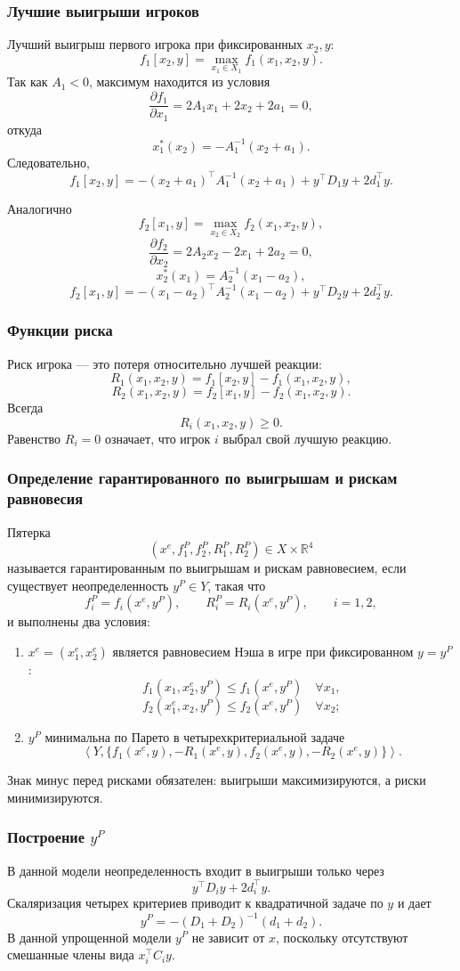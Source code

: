 \documentclass[12pt,a4paper]{article}
\newcommand{\R}{\mathbb{R}}
\begin{document}
\subsubsection{Лучшие выигрыши игроков}
Лучший выигрыш первого игрока при фиксированных $x_2,y$:
\[
f_1[x_2,y]=\max_{x_1\in X_1}f_1(x_1,x_2,y).
\]
Так как $A_1<0$, максимум находится из условия
\[
\frac{\partial f_1}{\partial x_1}=2A_1x_1+2x_2+2a_1=0,
\]
откуда
\[
x_1^*(x_2)=-A_1^{-1}(x_2+a_1).
\]
Следовательно,
\[
f_1[x_2,y]=-(x_2+a_1)^\top A_1^{-1}(x_2+a_1)+y^\top D_1y+2d_1^\top y.
\]

Аналогично
\[
f_2[x_1,y]=\max_{x_2\in X_2}f_2(x_1,x_2,y),
\]
\[
\frac{\partial f_2}{\partial x_2}=2A_2x_2-2x_1+2a_2=0,
\]
\[
x_2^*(x_1)=A_2^{-1}(x_1-a_2),
\]
\[
f_2[x_1,y]=-(x_1-a_2)^\top A_2^{-1}(x_1-a_2)+y^\top D_2y+2d_2^\top y.
\]

\subsubsection{Функции риска}
Риск игрока --- это потеря относительно лучшей реакции:
\[
R_1(x_1,x_2,y)=f_1[x_2,y]-f_1(x_1,x_2,y),
\]
\[
R_2(x_1,x_2,y)=f_2[x_1,y]-f_2(x_1,x_2,y).
\]
Всегда
\[
R_i(x_1,x_2,y)\ge 0.
\]
Равенство $R_i=0$ означает, что игрок $i$ выбрал свой лучшую реакцию.

\subsubsection{Определение гарантированного по выигрышам и рискам равновесия}
Пятерка
\[
(x^e,f_1^P,f_2^P,R_1^P,R_2^P)\in X\times\R^4
\]
называется гарантированным по выигрышам и рискам равновесием, если существует неопределенность $y^P\in Y$, такая что
\[
f_i^P=f_i(x^e,y^P),
\qquad R_i^P=R_i(x^e,y^P),
\qquad i=1,2,
\]
и выполнены два условия:
\begin{enumerate}
  \item $x^e=(x_1^e,x_2^e)$ является равновесием Нэша в игре при фиксированном $y=y^P$:
  \[
  f_1(x_1,x_2^e,y^P)\le f_1(x^e,y^P)\quad \forall x_1,
  \]
  \[
  f_2(x_1^e,x_2,y^P)\le f_2(x^e,y^P)\quad \forall x_2;
  \]
  \item $y^P$ минимальна по Парето в четырехкритериальной задаче
  \[
  \left\langle Y,\{f_1(x^e,y),-R_1(x^e,y),f_2(x^e,y),-R_2(x^e,y)\}\right\rangle.
  \]
\end{enumerate}

Знак минус перед рисками обязателен: выигрыши максимизируются, а риски минимизируются.

\subsubsection{Построение $y^P$}
В данной модели неопределенность входит в выигрыши только через
\[
y^\top D_i y+2d_i^\top y.
\]
Скаляризация четырех критериев приводит к квадратичной задаче по $y$ и дает
\[
y^P=-(D_1+D_2)^{-1}(d_1+d_2).
\]
В данной упрощенной модели $y^P$ не зависит от $x$, поскольку отсутствуют смешанные члены вида $x_i^\top C_i y$.
\end{document}
